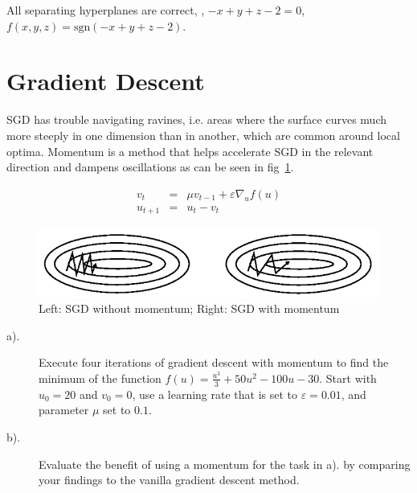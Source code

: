 \documentclass[12pt]{article}
\begin{document}
All separating hyperplanes are correct, \eg, $-x+y+z-2=0$, $f(x,y,z)=\mathrm{sgn}(-x+y+z-2)$.



\newpage 
\section{Gradient Descent}
SGD has trouble navigating ravines, i.e. areas where the surface curves much more steeply in one dimension than in another, which are common around local optima. Momentum is a method that helps accelerate SGD in the relevant direction and dampens oscillations as can be seen in fig~\ref{fig:momentum}.

\begin{eqnarray}
	v_t & = & \mu v_{t-1} + \varepsilon \nabla_u f(u) \label{eq:1} \\
	u_{t+1} & =& u_{t} - v_t \label{eq:2}
\end{eqnarray}

\begin{figure}[!htbp]
	\centering
	\includegraphics[width=.7\textwidth]{fig/2018-03-19-13-38-08.png}
	\caption{Left: SGD without momentum; Right: SGD with momentum} \label{fig:momentum}
\end{figure}

\begin{description}
	\item[a).] Execute four iterations of gradient descent with momentum to find the minimum of
	      the function $f(u) = \frac{u^3}{3} + 50 u^2-100u-30$. Start with $u_0 = 20$ and $v_0=0$, use a learning rate
	      that is set to $\varepsilon = 0.01$, and parameter $\mu$ set to $0.1$.
	\item[b).] Evaluate the benefit of using a momentum for the task in a). by comparing your
	      findings to the vanilla gradient descent method.
\end{description}
\end{document}
